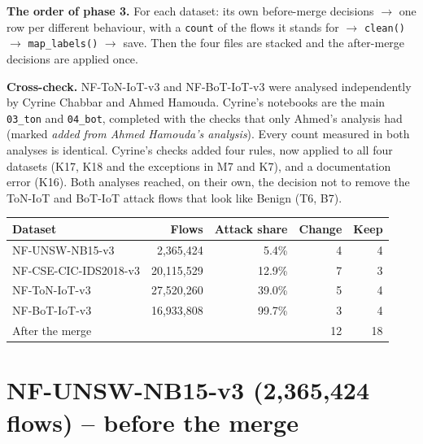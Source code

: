 \documentclass[10pt,a4paper]{article}
\begin{document}
\textbf{The order of phase 3.} For each dataset: its own before-merge decisions $\rightarrow$ one row per different
behaviour, with a \texttt{count} of the flows it stands for $\rightarrow$ \texttt{clean()} $\rightarrow$
\texttt{map\_labels()} $\rightarrow$ save. Then the four files are stacked and the after-merge decisions are applied once.

\textbf{Cross-check.} NF-ToN-IoT-v3 and NF-BoT-IoT-v3 were analysed independently by Cyrine Chabbar and Ahmed Hamouda.
Cyrine's notebooks are the main \texttt{03\_ton} and \texttt{04\_bot}, completed with the checks that only Ahmed's
analysis had (marked \emph{added from Ahmed Hamouda's analysis}). Every count measured in both analyses is identical.
Cyrine's checks added four rules, now applied to all four datasets (K17, K18 and the exceptions in M7 and K7), and a
documentation error (K16). Both analyses reached, on their own, the decision not to remove the ToN-IoT and BoT-IoT attack
flows that look like Benign (T6, B7).

\begin{center}
\begin{tabular}{lrrrr}
\toprule
\textbf{Dataset} & \textbf{Flows} & \textbf{Attack share} & \textbf{Change} & \textbf{Keep} \\
\midrule
NF-UNSW-NB15-v3 & 2,365,424 & 5.4\% & 4 & 4 \\
NF-CSE-CIC-IDS2018-v3 & 20,115,529 & 12.9\% & 7 & 3 \\
NF-ToN-IoT-v3 & 27,520,260 & 39.0\% & 5 & 4 \\
NF-BoT-IoT-v3 & 16,933,808 & 99.7\% & 3 & 4 \\
\midrule
After the merge & & & 12 & 18 \\
\bottomrule
\end{tabular}
\end{center}
\newpage
{\setlength{\parskip}{0pt}\tableofcontents}
\newpage
\section{NF-UNSW-NB15-v3 (2,365,424 flows) -- before the merge}
\end{document}
